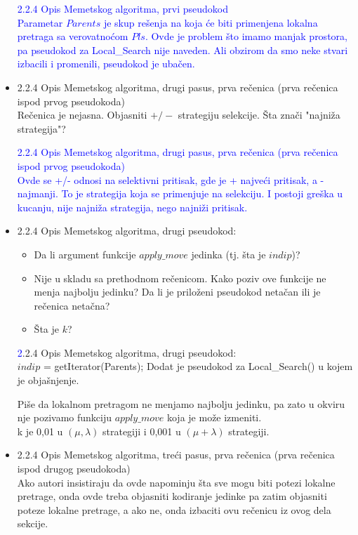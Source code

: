 \documentclass[a4paper]{report}
\newcommand{\odgovor}[1]{\textcolor{blue}{#1}}
\begin{document}
\begin{itemize}
    \odgovor{  2.2.4 Opis Memetskog algoritma, prvi pseudokod \\
    Parametar $Parents$ je skup rešenja na koja će biti primenjena lokalna pretraga sa verovatnoćom $Pls$.
    Ovde je problem što imamo manjak prostora, pa pseudokod za Local\_Search nije naveden. Ali obzirom da smo neke stvari izbacili i promenili, pseudokod je ubačen.}
    

    
    \item 2.2.4 Opis Memetskog algoritma, drugi pasus, prva rečenica (prva rečenica ispod prvog pseudokoda) \\
    Rečenica je nejasna. Objasniti $+/-$ strategiju selekcije. Šta znači "najniža strategija"?
 
    \odgovor{ 2.2.4 Opis Memetskog algoritma, drugi pasus, prva rečenica (prva rečenica ispod prvog pseudokoda)\\
    Ovde se +/- odnosi na selektivni pritisak, gde je + najveći pritisak, a - najmanji. To je strategija koja se primenjuje na selekciju. 
    I postoji greška u kucanju, nije najniža strategija, nego najniži pritisak.}
    
    \item 2.2.4 Opis Memetskog algoritma, drugi pseudokod: 
        \begin{itemize}
            \item Da li argument funkcije $apply\_move$ jedinka (tj. šta je $indip$)? 
            
            \item Nije u skladu sa prethodnom rečenicom. Kako poziv ove funkcije ne menja najbolju jedinku? Da li je priloženi pseudokod netačan ili je rečenica netačna? 
            \item Šta je $k$?
            
  \end{itemize}
  
 \odgovor 2.2.4 Opis Memetskog algoritma, drugi pseudokod: \\
 $indip$ = getIterator(Parents); 
 Dodat je pseudokod za Local\_Search() u kojem je objašnjenje.

  Piše da lokalnom pretragom ne menjamo najbolju jedinku, pa zato u okviru nje pozivamo funkciju $apply\_move$ koja je može izmeniti. \\
  k je 0,01 u $(\mu,\lambda)$ strategiji i 0,001 u $(\mu + \lambda)$ strategiji.      
    
 
    \item 2.2.4 Opis Memetskog algoritma, treći pasus, prva rečenica (prva rečenica ispod drugog  pseudokoda) \\
    Ako autori insistiraju da ovde napominju šta sve mogu biti potezi lokalne pretrage, onda ovde treba objasniti kodiranje jedinke pa zatim objasniti poteze lokalne pretrage, a ako ne, onda izbaciti ovu rečenicu iz ovog dela sekcije.
    

\end{itemize}
\end{document}
